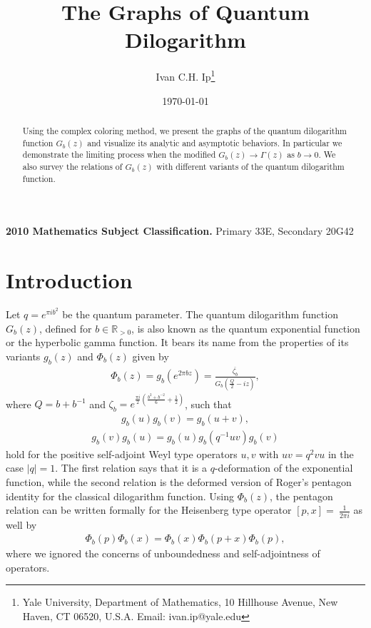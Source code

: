 \documentclass[10pt,reqno]{article}
\def\R{\mathbb{R}}
\def\to{\longrightarrow}
\def\G{\Gamma}
\def\ze{\zeta}
\def\inv{^{-1}}
\def\over[#1]{\overline{#1}}
\newcommand{\Eq}[1]{\begin{align}#1\end{align}}
\numberwithin{equation}{section}
\begin{document}
\title{The Graphs of Quantum Dilogarithm}

\author{  Ivan C.H. Ip\footnote{
          Yale University,
          Department of Mathematics,
          10 Hillhouse Avenue,
          New Haven, CT 06520,
          U.S.A.\newline
          Email: ivan.ip@yale.edu}
          }

\date{\today}


\maketitle

\begin{abstract}
Using the complex coloring method, we present the graphs of the quantum dilogarithm function $G_b(z)$ and visualize its analytic and asymptotic behaviors. In particular we demonstrate the limiting process when the modified $G_b(z)\to \G(z)$ as $b\to 0$. We also survey the relations of $G_b(z)$ with different variants of the quantum dilogarithm function.
\end{abstract}

{\small {\bf 2010 Mathematics Subject Classification.} Primary 33E, Secondary 20G42}

\tableofcontents
\section{Introduction} Let $q=e^{\pi ib^2}$ be the quantum parameter. The quantum dilogarithm function $G_b(z)$, defined for $b\in \R_{>0}$, is also known as the quantum exponential function or the hyperbolic gamma function. It bears its name from the properties of its variants $g_b(z)$ and $\Phi_b(z)$ given by
\Eq{\Phi_b(z)=g_b(e^{2\pi bz}) = \frac{\over[\ze_b]}{G_b(\frac{Q}{2}-iz)},}
where $Q=b+b\inv$ and $\ze_b=e^{\frac{\pi i}{2}(\frac{b^2+b^{-2}}{6}+\frac{1}{2})}$,
such that
\Eq{\label{qexp}g_b(u)g_b(v)=g_b(u+v),}
\Eq{\label{qpenta}g_b(v)g_b(u)=g_b(u)g_b(q\inv uv)g_b(v)}
hold for the positive self-adjoint Weyl type operators $u,v$ with $uv=q^2vu$ in the case $|q|=1$. The first relation says that it is a $q$-deformation of the exponential function, while the second relation is the deformed version of Roger's pentagon identity for the classical dilogarithm function.
Using $\Phi_b(z)$, the pentagon relation can be written formally for the Heisenberg type operator $[p,x]=~\frac{1}{2\pi i}$ as well by
\Eq{\Phi_b(p)\Phi_b(x)=\Phi_b(x)\Phi_b(p+x)\Phi_b(p),}
where we ignored the concerns of unboundedness and self-adjointness of operators.
\end{document}
